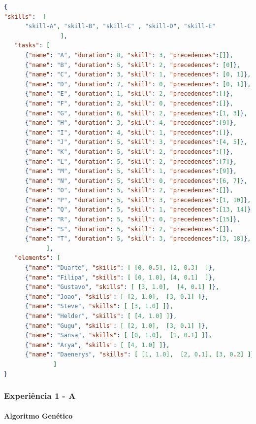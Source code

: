 \begin{titlepage}
\begin{lstlisting}[language=json,firstnumber=1]
{
"skills":  [ 
      "skill-A", "skill-B", "skill-C" , "skill-D", "skill-E"
                ], 
   "tasks": [
      {"name": "A", "duration": 8, "skill": 3, "precedences":[]},
      {"name": "B", "duration": 5, "skill": 2, "precedences": [0]},
      {"name": "C", "duration": 3, "skill": 1, "precedences": [0, 1]},
      {"name": "D", "duration": 7, "skill": 0, "precedences": [0, 1]},
      {"name": "E", "duration": 1, "skill": 2, "precedences":[]},
      {"name": "F", "duration": 2, "skill": 0, "precedences":[]},
      {"name": "G", "duration": 6, "skill": 2, "precedences":[1, 3]},
      {"name": "H", "duration": 3, "skill": 4, "precedences":[9]},
      {"name": "I", "duration": 4, "skill": 1, "precedences":[]},
      {"name": "J", "duration": 5, "skill": 3, "precedences":[4, 5]},
      {"name": "K", "duration": 5, "skill": 2, "precedences":[]},
      {"name": "L", "duration": 5, "skill": 2, "precedences":[7]},
      {"name": "M", "duration": 5, "skill": 1, "precedences":[9]},
      {"name": "N", "duration": 5, "skill": 0, "precedences":[6, 7]},
      {"name": "O", "duration": 5, "skill": 2, "precedences":[]},
      {"name": "P", "duration": 5, "skill": 3, "precedences":[1, 10]},
      {"name": "Q", "duration": 5, "skill": 1, "precedences":[13, 14]},
      {"name": "R", "duration": 5, "skill": 0, "precedences":[15]},
      {"name": "S", "duration": 5, "skill": 2, "precedences":[]},
      {"name": "T", "duration": 5, "skill": 3, "precedences":[3, 18]},
            ],
   "elements": [
      {"name": "Duarte", "skills": [ [0, 0.5], [2, 0.3]  ]},
      {"name": "Filipa", "skills": [ [0, 1.0], [4, 0.1]  ]},
      {"name": "Gustavo", "skills": [ [3, 1.0],  [4, 0.1] ]},
      {"name": "Joao", "skills": [ [2, 1.0],  [3, 0.1] ]},
      {"name": "Steve", "skills": [ [3, 1.0] ]},
      {"name": "Helder", "skills": [ [4, 1.0] ]},
      {"name": "Gugu", "skills": [ [2, 1.0],  [3, 0.1] ]},
      {"name": "Sansa", "skills": [ [0, 1.0],  [1, 0.1] ]}, 
      {"name": "Arya", "skills": [ [4, 1.0] ]}, 
      {"name": "Daenerys", "skills": [ [1, 1.0],  [2, 0.1], [3, 0.2] ]}
              ]
}
\end{lstlisting}

\subsubsection{Experiência 1 - A}

\paragraph{Algoritmo Genético}


\end{titlepage}
